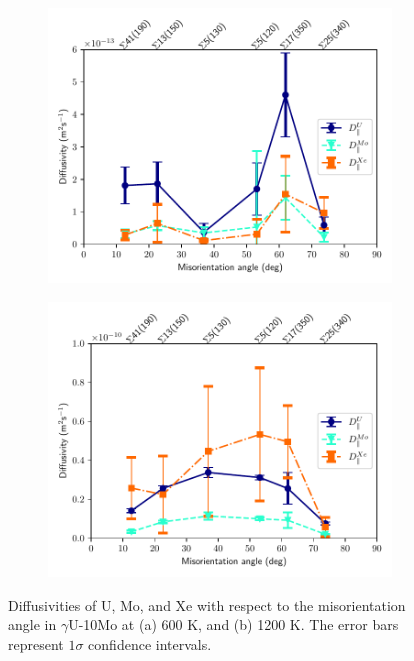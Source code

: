 \documentclass{elsarticle}
\begin{document}
\begin{figure}[!ht]
    \centering
    \begin{subfigure}{0.49\textwidth}
        \centering
        \caption{}
        \includegraphics[width=\textwidth]{DvsTilt_600K.pdf}
    \end{subfigure}
    \begin{subfigure}{0.49\textwidth}
        \centering
        \caption{}
        \includegraphics[width=\textwidth]{DvsTilt_1200K.pdf}
    \end{subfigure}
\caption{Diffusivities of U, Mo, and Xe with respect to the misorientation angle in $\gamma$U-10Mo at (a) 600 K, and (b) 1200 K. The error bars represent $1\sigma$ confidence intervals.}
\label{fig:dvstilt}
\end{figure}
\end{document}

